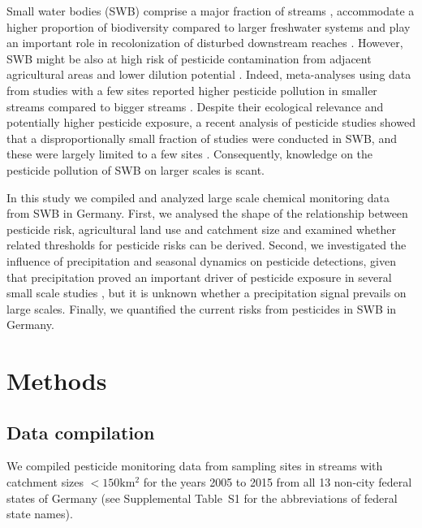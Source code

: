 \documentclass[journal=esthag,manuscript=article]{achemso}
\begin{document}
Small water bodies (SWB) comprise a major fraction of streams \citep{nadeau_hydrological_2007}
, accommodate a higher proportion of biodiversity compared to larger freshwater systems \citep{davies_comparison_2008, biggs_report_2014} and play an important role in recolonization of disturbed downstream reaches \citep{liess_analyzing_2005, orlinskiy_forested_2015}.
However, SWB might be also at high risk of pesticide contamination from adjacent agricultural areas and lower dilution potential \citep{schulz_field_2004,liess_determination_1999}.
Indeed, meta-analyses using data from studies with a few sites reported higher pesticide pollution in smaller streams compared to bigger streams \citep{stehle_pesticide_2015,schulz_field_2004}.
Despite their ecological relevance and potentially higher pesticide exposure, a recent analysis of pesticide studies showed that a disproportionally small fraction of studies were conducted in SWB, and these were largely limited to a few sites \citep{lorenz_specifics_2016}. Consequently, knowledge on the pesticide pollution of SWB on larger scales is scant.

In this study we compiled and analyzed large scale chemical monitoring data from SWB in Germany. First, we analysed the shape of the relationship between pesticide risk, agricultural land use and catchment size and examined whether related thresholds for pesticide risks can be derived. Second, we investigated the influence of precipitation and seasonal dynamics on pesticide detections, given that precipitation proved an important driver of pesticide exposure in several small scale studies \citep{wittmer_significance_2010}\citep{schulz_field_2004}, but it is unknown whether a precipitation signal prevails on large scales. 
Finally, we quantified the current risks from pesticides in SWB in Germany.



\section{Methods}
\subsection{Data compilation}
We compiled pesticide monitoring data from sampling sites in streams with catchment sizes $\mathrm{< 150km^2}$ for the years 2005 to 2015 from all 13 non-city federal states of Germany (see Supplemental Table~S1 for the abbreviations of federal state names). 
\end{document}
